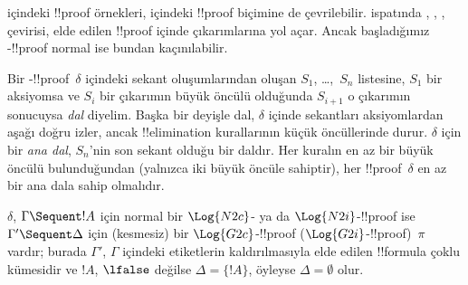 \documentclass[../../../include/open-logic-section]{subfiles}
\begin{document}
 içindeki !!{proof} örnekleri,  içindeki !!{proof} biçimine
de çevrilebilir.  ispatında
\Elim{\land}, \Elim{\lif}, \Elim{\lnot}, \Elim{\lforall} çevirisi,
elde edilen  !!{proof} içinde \Cut{} çıkarımlarına yol açar.
Ancak başladığımız -!!{proof} normal ise bundan kaçınılabilir.

Bir -!!{proof}~$\delta$ içindeki sekant oluşumlarından
oluşan $S_1$, \dots,~$S_n$ listesine, $S_1$ bir aksiyomsa ve $S_i$ bir
çıkarımın büyük öncülü olduğunda $S_{i+1}$ o çıkarımın sonucuysa
\emph{dal} diyelim. Başka bir deyişle dal, $\delta$ içinde sekantları
aksiyomlardan aşağı doğru izler, ancak !!{elimination}
kurallarının küçük öncüllerinde durur. $\delta$ için bir \emph{ana dal},
$S_n$'nin son sekant olduğu bir daldır. Her kuralın en az bir büyük
öncülü bulunduğundan (yalnızca \Intro{\land} iki büyük öncüle sahiptir),
her !!{proof}~$\delta$ en az bir ana dala sahip olmalıdır.


\begin{prop} $\delta$, $\Gamma \Sequent
!A$ için normal bir $\Log{N2c}$- ya da $\Log{N2i}$-!!{proof} ise
$\Gamma' \Sequent \Delta$ için (kesmesiz) bir $\Log{G2c}$-!!{proof}
($\Log{G2i}$-!!{proof})~$\pi$ vardır; burada $\Gamma'$, $\Gamma$
içindeki etiketlerin kaldırılmasıyla elde edilen !!{formula} çoklu
kümesidir ve $!A$, $\lfalse$ değilse $\Delta = \{!A\}$, öyleyse
$\Delta = \emptyset$ olur.
\end{prop}
\end{document}
